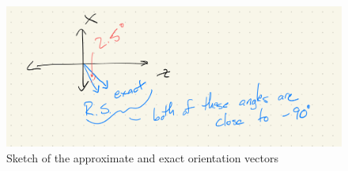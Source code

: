 \documentclass{article}
\begin{document}
\begin{figure}
  \centering
  \includegraphics[width=.75\textwidth]{orient-sketch}
  \caption{Sketch of the approximate and exact orientation vectors}
  \label{fig:orient-sketch}
\end{figure}
  
\end{document}
